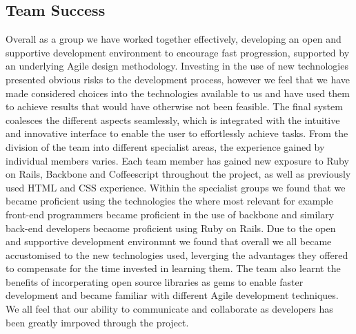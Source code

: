 	\subsection{Team Success}
		Overall as a group we have worked together effectively, developing an open and supportive development environment to encourage fast progression, supported by an underlying Agile design methodology.
		Investing in the use of new technologies presented obvious risks to the development process, however we feel that we have made considered choices into the technologies available to us and have used them to achieve results that would have otherwise not been feasible.
		The final system coalesces the different aspects seamlessly, which is integrated with the intuitive and innovative interface to enable the user to effortlessly achieve tasks.
		From the division of the team into different specialist areas, the experience gained by individual members varies. Each team member has gained new exposure to Ruby on Rails, Backbone and Coffeescript throughout the project, as well as previously used HTML and CSS experience. Within the specialist groups we found that we became proficient using the technologies the where most relevant for example front-end programmers became proficient in the use of backbone and similary back-end developers becaome proficient using Ruby on Rails. Due to the open and supportive development environmnt we found that overall we all became accustomised to the new technologies used, leverging the advantages they offered to compensate for the time invested in learning them. 
		The team also learnt the benefits of incorperating open source libraries as gems to enable faster development and became familiar with different Agile development techniques. We all feel that our ability to communicate and collaborate as developers has been greatly imrpoved through the project.
		
		
